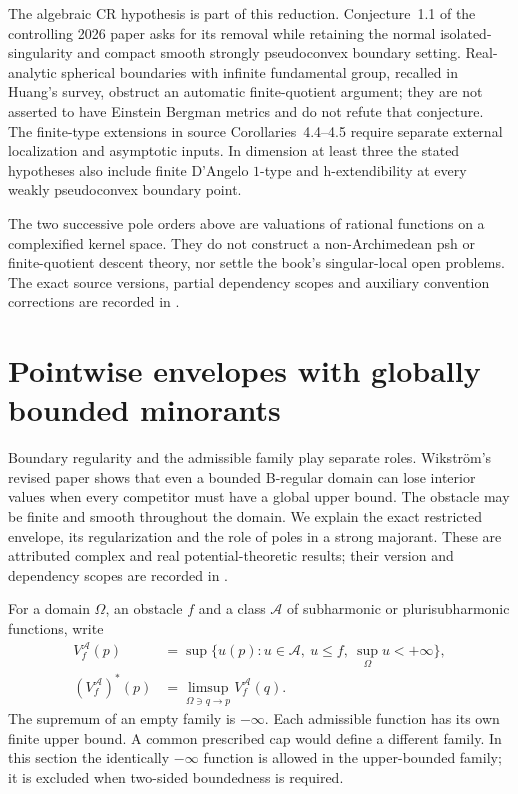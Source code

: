 The algebraic CR hypothesis is part of this reduction.
Conjecture~1.1 of the controlling 2026 paper asks for its removal
while retaining the normal isolated-singularity and compact
smooth strongly pseudoconvex boundary setting. Real-analytic
spherical boundaries with infinite fundamental group, recalled
in Huang's survey, obstruct an automatic finite-quotient
argument; they are not asserted to have Einstein Bergman metrics
and do not refute that conjecture. The finite-type extensions
in source Corollaries~4.4--4.5 require separate external
localization and asymptotic inputs. In dimension at least three
the stated hypotheses also include finite D'Angelo $1$-type
and h-extendibility at every weakly pseudoconvex boundary point.

The two successive pole orders above are valuations of
rational functions on a complexified kernel space. They do
not construct a non-Archimedean psh or finite-quotient descent
theory, nor settle the book's singular-local open problems.
The exact source versions, partial dependency scopes and
auxiliary convention corrections are recorded in
.

\section{Pointwise envelopes with globally bounded minorants}
\label{sec:appH-bounded-minorants}

Boundary regularity and the admissible family play separate roles.
Wikstr\"om's revised paper
\cite{Wikstrom26BoundedMinorantsV2} shows that even a bounded B-regular
domain can lose interior values when every competitor must have a
global upper bound. The obstacle may be finite and smooth throughout
the domain. We explain the exact restricted envelope, its regularization
and the role of poles in a strong majorant. These are attributed complex
and real potential-theoretic results; their version and dependency scopes
are recorded in .

For a domain $\Omega$, an obstacle $f$ and a class $\mathcal A$ of
subharmonic or plurisubharmonic functions, write
\begin{equation*}
\begin{aligned}
 V_f^{\mathcal A}(p)
   &=\sup\{u(p):u\in\mathcal A,\ u\leq f,\ \sup_\Omega u<+\infty\},\\
 (V_f^{\mathcal A})^*(p)
   &=\limsup_{\Omega\ni q\to p}V_f^{\mathcal A}(q).
\end{aligned}
\tag{H.48}\label{eq:appH-restricted-envelope}
\end{equation*}
The supremum of an empty family is $-\infty$. Each admissible function
has its own finite upper bound. A common prescribed cap would define
a different family. In this section the identically $-\infty$ function
is allowed in the upper-bounded family; it is excluded when two-sided
boundedness is required.

